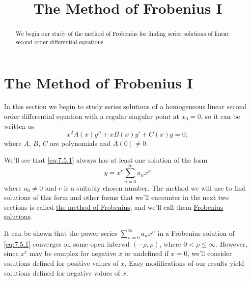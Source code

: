 \documentclass{ximera}
\title{The Method of Frobenius I}%
\begin{document}
\begin{abstract}
We begin our study of the method of Frobenius for finding series solutions of linear second order differential equations.
\end{abstract}

\maketitle

\section*{The Method of Frobenius I}

In this section we begin to study  series solutions of a
homogeneous linear second order differential equation with a regular
singular point at $x_0=0$, so it can be written as
\begin{equation} \label{eq:7.5.1}
x^2A(x)y''+xB(x)y'+C(x)y=0,
\end{equation}
where $A$, $B$, $C$ are polynomials and $A(0)\neq 0$.

We'll see that \eqref{eq:7.5.1} always has at least one solution of
the form
$$
y=x^r\sum_{n=0}^\infty a_nx^n
$$
where $a_0\ne0$ and $r$ is a suitably chosen number.
The method  we
will use to find solutions of this form and other forms that we'll
encounter in the next two sections is called
\href{http://www-history.mcs.st-and.ac.uk/Mathematicians/Frobenius.html}{the method of Frobenius},
and we'll call them
\href{http://www-history.mcs.st-and.ac.uk/Mathematicians/Frobenius.html}{Frobenius solutions}.

It can be shown that the power series $\sum_{n=0}^\infty a_nx^n$ in a
Frobenius solution of \eqref{eq:7.5.1} converges on some open interval
$(-\rho,\rho)$, where $0<\rho\leq\infty$. However, since $x^r$ may be
complex for negative $x$ or undefined if $x=0$, we'll consider
solutions defined for positive values of $x$. Easy modifications of
our results yield solutions defined for negative values of $x$.
\end{document}
